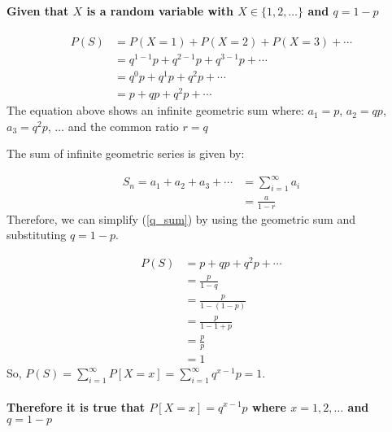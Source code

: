 \documentclass[a4paper]{article}
\begin{document}
    \paragraph*{Given that $X$ is a random variable with $X \in \{1, 2, \ldots\}$ and $q = 1 - p$}

    \begin{align}
        P(S) &= P(X=1) + P(X=2) + P(X=3) + \cdots\\
        &= q^{1-1}p + q^{2-1}p + q^{3-1}p + \cdots\\
        &= q^{0}p + q^{1}p + q^{2}p + \cdots\\
        &= p + qp + q^{2}p + \cdots \label{q_sum}
    \end{align}
    The equation above shows an infinite geometric sum where: $a_1 = p$, $a_2 = qp$, $a_3 = q^{2}p$, $\ldots$ and the common ratio $r = q$

    The sum of infinite geometric series is given by:

    \begin{align*}
        S_n = a_1 + a_2 + a_3 + \cdots &= \sum_{i=1}^{\infty}a_i\\
        &= \frac{a}{1 - r}
    \end{align*}
    Therefore, we can simplify (\ref{q_sum}) by using the geometric sum and substituting $q = 1 - p$.

    \begin{align*}
        P(S) &= p + qp + q^{2}p + \cdots\\
        &= \frac{p}{1 - q}\\
        &= \frac{p}{1 - (1 - p)}\\
        &= \frac{p}{1 - 1 + p}\\
        &= \frac{p}{p}\\
        &= 1
    \end{align*}
    So, $P(S) = \sum_{i=1}^{\infty}P[X=x] = \sum_{i=1}^{\infty}q^{x-1}p = 1$.

    \paragraph*{Therefore it is true that $P[X=x] = q^{x-1}p$ where $x = 1, 2, \ldots$ and $q = 1 - p$}
\end{document}
